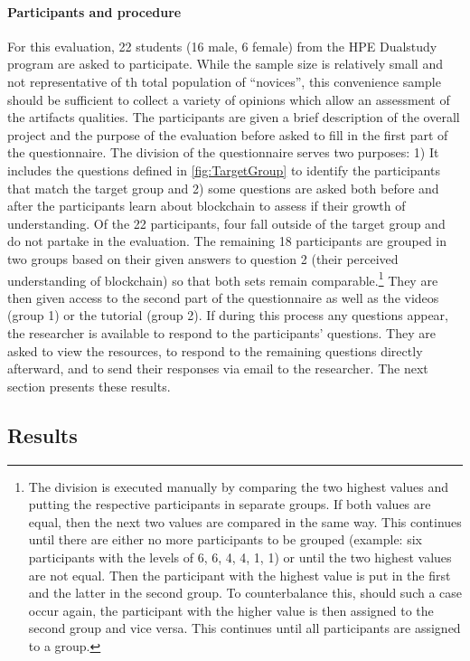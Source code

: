 \paragraph{Participants and procedure}
For this evaluation, 22 students (16 male, 6 female) from the HPE Dualstudy program are asked to participate. While the sample size is relatively small and not representative of th total population of \enquote{novices}, this convenience sample should be sufficient to collect a variety of opinions which allow an assessment of the artifacts qualities. The participants are given a brief description of the overall project and the purpose of the evaluation before asked to fill in the first part of the questionnaire. The division of the questionnaire serves two purposes: 1) It includes the questions defined in \ref{fig:TargetGroup} to identify the participants that match the target group and 2) some questions are asked both before and after the participants learn about blockchain to assess if their growth of understanding. Of the 22 participants, four fall outside of the target group and do not partake in the evaluation. The remaining 18 participants are grouped in two groups based on their given answers to question 2 (their perceived understanding of blockchain) so that both sets remain comparable.\footnote{The division is executed manually by comparing the two highest values and putting the respective participants in separate groups. If both values are equal, then the next two values are compared in the same way. This continues until there are either no more participants to be grouped (example: six participants with the levels of 6, 6, 4, 4, 1, 1) or until the two highest values are not equal. Then the participant with the highest value is put in the first and the latter in the second group. To counterbalance this, should such a case occur again, the participant with the higher value is then assigned to the second group and vice versa. This continues until all participants are assigned to a group.}
They are then given access to the second part of the questionnaire as well as the videos (group 1) or the tutorial (group 2). If during this process any questions appear, the researcher is available to respond to the participants' questions. They are asked to view the resources, to respond to the remaining questions directly afterward, and to send their responses via email to the researcher. The next section presents these results.

\subsection{Results} \label{subsec:EvaluationResults}

